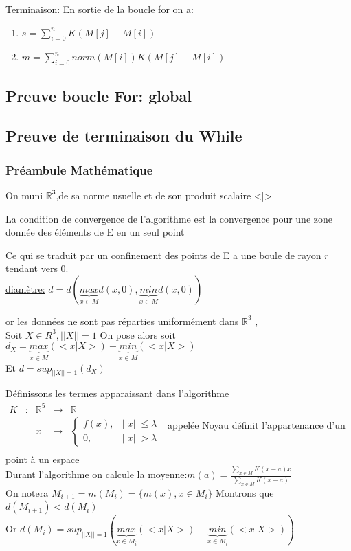 \documentclass[12pt,a4paper]{article}
\newcommand{\ns}{\\\indent\indent\vspace{0.25cm}}
\newcommand{\R}{\mathbb{R}}
\newcommand{\fct}[5]
	{
	  \begin{array}{ccccc}
		#1 & : & #2 & \to & #3 \\
	    && #4 & \mapsto & #5 \\
	  \end{array}
    }
\begin{document}
\underline{Terminaison}: En sortie de la boucle for on a:
\begin{enumerate}
    \item $s = \sum_{i=0}^{n} K(M[j]-M[i])$
    \item $m = \sum_{i=0}^n norm(M[i])K(M[j]-M[i])$
\end{enumerate}
\subsection*{Preuve boucle For: global}
\subsection*{Preuve de terminaison du While}

\subsubsection*{Préambule Mathématique}
On muni $\R^3$,de sa norme usuelle et de son produit scalaire <|>\ns

La condition de convergence de l'algorithme est la convergence pour une zone donnée des éléments de E en un seul point 

Ce qui se traduit par un confinement des points de E a une boule de rayon $r$ tendant vers 0.\\


\underline{diamètre:} $d = d(\underbrace{max}_{x \in M}d(x,0),\underbrace{min}_{x \in M}d(x,0))$

or les données ne sont pas réparties uniformément dans $\R^3$ ,\\
Soit $X \in R^3, ||X|| = 1$
On pose alors soit $d_X =  \underbrace{max}_{x \in M}(<x|X>)-\underbrace{min}_{x \in M}(<x|X>)$\\
Et $d = sup_{||X||=1}(d_X)$

Définissons les termes apparaissant dans l'algorithme\\
$\fct{K}{\R^5}{\R}{x}{\begin{cases} f(x), & ||x|| \leq \lambda\\
0, & ||x|| > \lambda
\end{cases}}$  appelée Noyau définit l'appartenance d'un point à un espace\\
Durant l'algorithme on calcule la moyenne:$m(a) = \frac{\sum_{x\in M}K(x-a)x}{\sum_{x\in M}K(x-a)}$\\
On notera $M_{i+1} = m(M_i) = \lbrace m(x), x \in M_i \rbrace$
Montrons que $d(M_{i+1})< d(M_i)$\\
Or $d(M_i) = sup_{||X||=1}(\underbrace{max}_{x \in M_i}(<x|X>)-\underbrace{min}_{x \in M_i}(<x|X>))$\\
\end{document}
